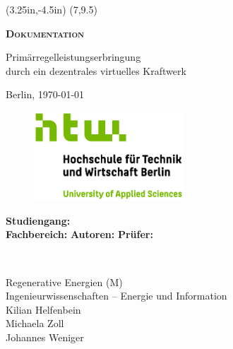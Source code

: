 \begin{titlepage}
	\begin{center}
	
		\thisfancyput(3.25in,-4.5in){%
			\setlength{\unitlength}{2.5cm}\fancyoval(7,9.5)}
		
		\vspace*{1cm}
		
		\textbf{\textsc{{\huge Dokumentation}}}
 
		\vspace{0.5cm}

		{\Large Primärregelleistungserbringung\\\medskip\noindent durch ein dezentrales virtuelles Kraftwerk}
 
		\vspace{0.5cm}

		Berlin, \today
       
		\vspace*{1cm}
       
		\begin{figure}[H]
			\includegraphics[width=0.5\textwidth, center]{Bilder/HTWLogo.jpg}
		\end{figure}
 
		\vfill
 
		\vspace{0.8cm}
 
		\begin{minipage}{0.4\textwidth}
			\begin{flushleft}
				\textbf{Studiengang:}\\
				\textbf{Fachbereich:}\newline\newline
				\textbf{Autoren:}\newline\newline
				\textbf{Prüfer:}\\
			\end{flushleft}
		\end{minipage}~
		\begin{minipage}{0.4\textwidth}            
			\begin{flushright}
				Regenerative Energien (M)\\
				Ingenieurwissenschaften – Energie und Information\\
				Kilian Helfenbein\\
				Michaela Zoll\\
				Johannes Weniger\\
			\end{flushright}        
		\end{minipage}\\[2 cm]
		
	\end{center}
\end{titlepage}

\newpage